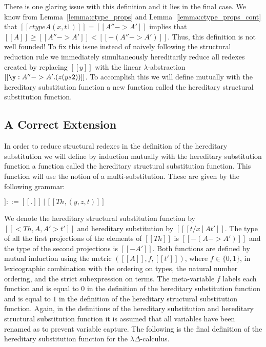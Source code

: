 There is one glaring issue with this definition and it lies in the final case.  
We know from Lemma~\ref{lemma:ctype_props} and Lemma~\ref{lemma:ctype_props_cont} 
that $[[ctype A (x,t1)]] = [[A'' -> A']]$ 
implies that $[[A]] \geq [[A'' -> A']] < [[{-(A'' ->  A')}]]$. Thus, this 
definition is not well founded!  To fix this issue instead of naively following 
the structural reduction rule we immediately simultaneously hereditarily reduce 
all redexes created by replacing $[[y]]$ with the linear $\lambda$-abstraction
$[[\y:A'' ->A'.(z (y s2))]]$.  To accomplish this we will define mutually with
the hereditary substitution function a new function called the hereditary
structural substitution function.

\subsection{A Correct Extension}
\label{subsec:the_final_extension}
In order to reduce structural redexes in the definition of the
hereditary substitution we will define by induction mutually with
the hereditary substitution function  a function called the
hereditary structural substitution function.  This function will
use the notion of a multi-substitution.  These are
given by the following grammar:
\begin{center}
  \begin{math}
    [[Th]] ::= [[.]]\,|\,[[Th,(y,z,t)]]
  \end{math}
\end{center}
We denote the hereditary structural substitution function by $[[<Th ,
A, A'>t']]$ and hereditary substitution by $[[ [t/x] A t']]$.  The
type of all the first projections of the elements of $[[Th]]$ is
$[[{-(A->A')}]]$ and the type of the second projections is $[[{-A'}]]$.
Both functions are defined by mutual induction using the metric
$([[A]],f,[[t']])$, where $f \in \{0,1\}$, in lexicographic
combination with the ordering on types, the natural number ordering,
and the strict subexpression on terms.  The meta-variable $f$ labels
each function and is equal to $0$ in the definition of the hereditary
substitution function and is equal to $1$ in the definition of the
hereditary structural substitution function.  Again, in the definitions of
the hereditary substitution and hereditary structural substitution
function it is assumed that all variables have been renamed as to
prevent variable capture.  The following is the final definition of the
hereditary substitution function for the $\lambda\Delta$-calculus.

